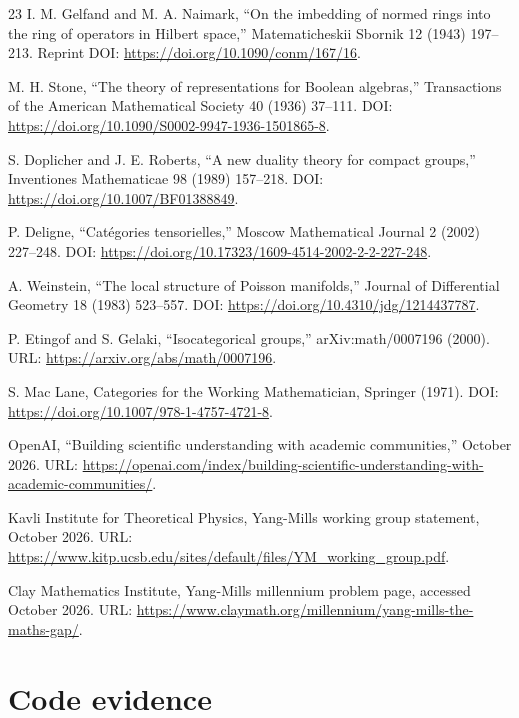 \documentclass[11pt,letterpaper]{article}
\theoremstyle{definition}
\theoremstyle{remark}
\begin{document}
\begin{thebibliography}{23}
I. M. Gelfand and M. A. Naimark, ``On the imbedding of normed rings into the ring of operators in Hilbert space,'' Matematicheskii Sbornik 12 (1943) 197--213. Reprint DOI: \url{https://doi.org/10.1090/conm/167/16}.

M. H. Stone, ``The theory of representations for Boolean algebras,'' Transactions of the American Mathematical Society 40 (1936) 37--111. DOI: \url{https://doi.org/10.1090/S0002-9947-1936-1501865-8}.

S. Doplicher and J. E. Roberts, ``A new duality theory for compact groups,'' Inventiones Mathematicae 98 (1989) 157--218. DOI: \url{https://doi.org/10.1007/BF01388849}.

P. Deligne, ``Cat\'egories tensorielles,'' Moscow Mathematical Journal 2 (2002) 227--248. DOI: \url{https://doi.org/10.17323/1609-4514-2002-2-2-227-248}.

A. Weinstein, ``The local structure of Poisson manifolds,'' Journal of Differential Geometry 18 (1983) 523--557. DOI: \url{https://doi.org/10.4310/jdg/1214437787}.

P. Etingof and S. Gelaki, ``Isocategorical groups,'' arXiv:math/0007196 (2000). URL: \url{https://arxiv.org/abs/math/0007196}.

S. Mac Lane, Categories for the Working Mathematician, Springer (1971). DOI: \url{https://doi.org/10.1007/978-1-4757-4721-8}.

OpenAI, ``Building scientific understanding with academic communities,'' October 2026. URL: \url{https://openai.com/index/building-scientific-understanding-with-academic-communities/}.

Kavli Institute for Theoretical Physics, Yang-Mills working group statement, October 2026. URL: \url{https://www.kitp.ucsb.edu/sites/default/files/YM_working_group.pdf}.

Clay Mathematics Institute, Yang-Mills millennium problem page, accessed October 2026. URL: \url{https://www.claymath.org/millennium/yang-mills-the-maths-gap/}.

\end{thebibliography}

\appendix
\section{Code evidence}
\label{app:code}
\end{document}
